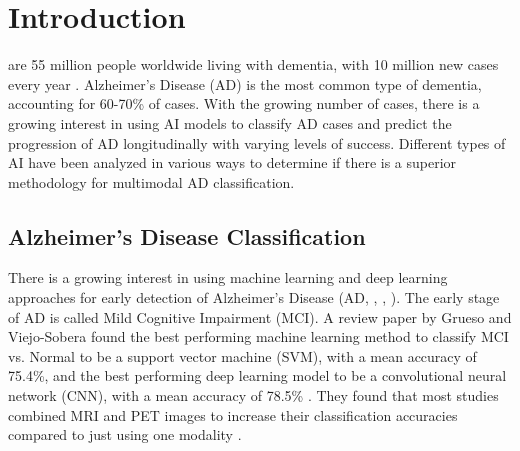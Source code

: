 \section{Introduction}
\label{sec:introduction}
 are 55 million people worldwide living with dementia, with 10 million new cases every year \cite{who_dementia_nodate}. Alzheimer's Disease (AD) is the most common type of dementia, accounting for 60-70\% of cases. With the growing number of cases, there is a growing interest in using AI models to classify AD cases and predict the progression of AD longitudinally with varying levels of success. Different types of AI have been analyzed in various ways to determine if there is a superior methodology for multimodal AD classification.


\subsection{Alzheimer's Disease Classification}
There is a growing interest in using machine learning and deep learning approaches for early detection of Alzheimer's Disease (AD, \cite{lin_convolutional_2018}, \cite{grueso_machine_2021}, \cite{borchert_artificial_2021}). The early stage of AD is called Mild Cognitive Impairment (MCI). A review paper by Grueso and Viejo-Sobera found the best performing machine learning method to classify MCI vs. Normal to be a support vector machine (SVM), with a mean accuracy of 75.4\%, and the best performing deep learning model to be a convolutional neural network (CNN), with a mean accuracy of 78.5\% \cite{grueso_machine_2021}. They found that most studies combined MRI and PET images to increase their classification accuracies compared to just using one modality \cite{grueso_machine_2021}\cite{borchert_artificial_2021}. 

